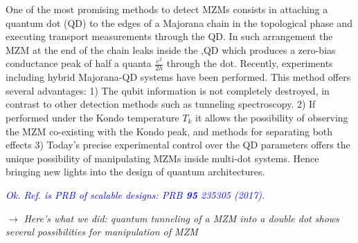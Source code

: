 \documentclass[showpacs,aps,prb,reprint,superscriptaddress]{revtex4-1}
\newcommand{\TS}[1]{{$\rightarrow$ {\sl#1}}}
\newcommand{\LUIS}[1]{\textcolor{blue}{\fbox{Luis} {\sl#1}}}
\begin{document}
One of the most promising methods to detect MZMs consists in attaching a quantum dot (QD) to the edges of a Majorana chain in the topological phase and executing transport measurements through the QD. \cite{liu_detecting_2011}  In such arrangement the MZM at the end of the chain leaks inside the ,QD \cite{vernek_subtle_2014} which produces a zero-bias conductance peak of half a quanta $\frac{e^{2}}{2h}$ through the dot. Recently, experiments including hybrid Majorana-QD systems have been performed. \cite{deng_majorana_2016} This method offers several advantages: 1) The qubit information  is not completely destroyed, in contrast to other detection methods such as tunneling spectroscopy. 2) If performed under the  Kondo temperature $T_k$ it allows the possibility of observing the  MZM co-existing with the Kondo peak, \cite{lee_kondo_2013,ruiz-tijerina_interaction_2015,gorski_interplay_2018} and methods for separating both effects 3) Today’s precise experimental control over the QD parameters offers the unique possibility of manipulating MZMs inside multi-dot systems. Hence bringing new lights into the design of quantum architectures. \cite{barkeshli_physical_2015,karzig_scalable_2017} 


\LUIS{Ok. Ref.  is PRB of scalable designs: PRB \textbf{95} 235305 (2017). }







\TS{Here's what we did: quantum tunneling of a MZM into a double dot shows several possibilities for manipulation of MZM}
\end{document}
